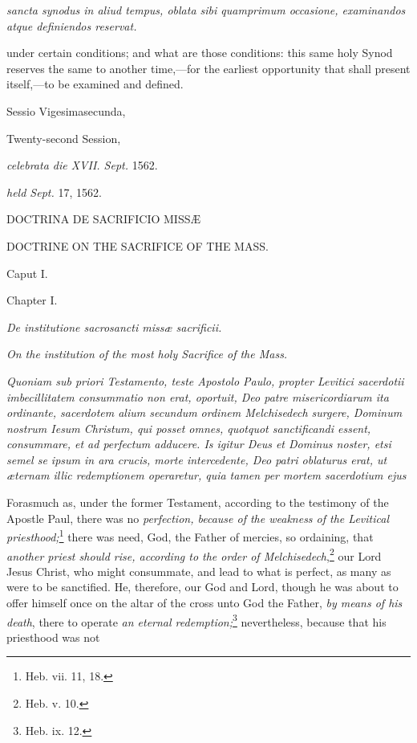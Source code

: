 \emph{sancta synodus in aliud tempus, oblata sibi quamprimum occasione, examinandos atque definiendos reservat.}

under certain conditions; and what are those conditions: this same holy Synod reserves the same to another time,—for the earliest opportunity that shall present itself,—to be examined and defined.


Sessio Vigesimasecunda,

Twenty-second Session,

\emph{celebrata die XVII. Sept.} 1562.

\emph{held Sept.} 17, 1562.

DOCTRINA DE SACRIFICIO MISSÆ

DOCTRINE ON THE SACRIFICE OF THE MASS.

Caput I.

Chapter I.

\emph{De institutione sacrosancti missæ sacrificii.}

\emph{On the institution of the most holy Sacrifice of the Mass.}

\emph{Quoniam sub priori Testamento, teste Apostolo Paulo, propter Levitici sacerdotii imbecillitatem consummatio non erat, oportuit, Deo patre misericordiarum ita ordinante, sacerdotem alium secundum ordinem Melchisedech surgere, Dominum nostrum Iesum Christum, qui posset omnes, quotquot sanctificandi essent, consummare, et ad perfectum adducere. Is igitur Deus et Dominus noster, etsi semel se ipsum in ara crucis, morte intercedente, Deo patri oblaturus erat, ut æternam illic redemptionem operaretur, quia tamen per mortem sacerdotium ejus }

Forasmuch as, under the former Testament, according to the testimony of the Apostle Paul, there was no \emph{perfection, because of the weakness of the Levitical priesthood;}\footnote{\par   Heb. vii. 11, 18.} there was need, God, the Father of mercies, so ordaining, that \emph{another priest should rise, according to the order of Melchisedech},\footnote{\par   Heb. v. 10.} our Lord Jesus Christ, who might consummate, and lead to what is perfect, as many as were to be sanctified. He, therefore, our God and Lord, though he was about to offer himself once on the altar of the cross unto God the Father, \emph{by means of his death}, there to operate \emph{an eternal redemption;}\footnote{\par   Heb. ix. 12.} nevertheless, because that his priesthood was not

